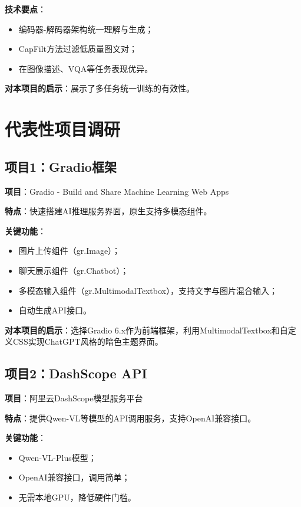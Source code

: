 \textbf{技术要点}：
\begin{itemize}
  \item 编码器-解码器架构统一理解与生成；
  \item CapFilt方法过滤低质量图文对；
  \item 在图像描述、VQA等任务表现优异。
\end{itemize}

\textbf{对本项目的启示}：展示了多任务统一训练的有效性。

\section{代表性项目调研}
\label{sec:projects}

\subsection{项目1：Gradio框架}

\textbf{项目}：Gradio - Build and Share Machine Learning Web Apps\cite{gradio2023}

\textbf{特点}：快速搭建AI推理服务界面，原生支持多模态组件。

\textbf{关键功能}：
\begin{itemize}
  \item 图片上传组件（gr.Image）；
  \item 聊天展示组件（gr.Chatbot）；
  \item 多模态输入组件（gr.MultimodalTextbox），支持文字与图片混合输入；
  \item 自动生成API接口。
\end{itemize}

\textbf{对本项目的启示}：选择Gradio 6.x作为前端框架，利用MultimodalTextbox和自定义CSS实现ChatGPT风格的暗色主题界面。

\subsection{项目2：DashScope API}

\textbf{项目}：阿里云DashScope模型服务平台\cite{dashscope2023}

\textbf{特点}：提供Qwen-VL等模型的API调用服务，支持OpenAI兼容接口。

\textbf{关键功能}：
\begin{itemize}
  \item Qwen-VL-Plus模型；
  \item OpenAI兼容接口，调用简单；
  \item 无需本地GPU，降低硬件门槛。
\end{itemize}

